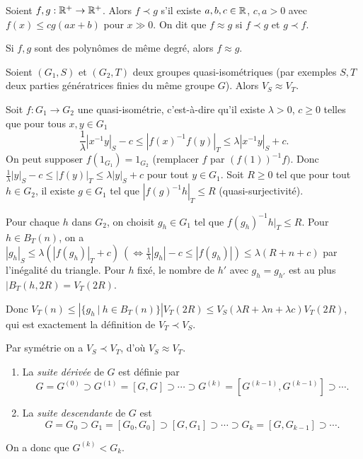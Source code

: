     \begin{defi}
      Soient $f, g: \mathbb{R}^+ \to \mathbb{R}^+$. Alors $f \prec g$ s'il existe $a, b, c \in \mathbb{R}$, $c, a > 0$ avec $f(x) \leq
      cg(ax+b)$ pour $x \gg 0$.
      On dit que $f \approx g$ si $f \prec g$ et $g \prec f$.
    \end{defi}

    \begin{exercice}
      Si $f, g$ sont des polynômes de même degré, alors $f \approx g$.
    \end{exercice}

    \begin{prop}
      Soient $(G_1, S)$ et $(G_2, T)$ deux groupes quasi-isométriques (par exemples $S, T$ deux parties
      génératrices finies du même groupe $G$). Alors $V_S \approx V_T$.
    \end{prop}

    \begin{preuve}
      Soit $f: G_1 \to G_2$ une quasi-isométrie, c'est-à-dire qu'il existe $\lambda > 0$, $c \geq 0$ telles
      que pour tous $x, y \in G_1$
        \[\frac{1}{\lambda} |x^{-1}y|_S - c \leq |f(x)^{-1}f(y)|_T \leq \lambda |x^{-1}y|_S + c.\]
      On peut supposer $f(1_{G_1}) = 1_{G_2}$ (remplacer $f$ par $(f(1))^{-1}f)$. Donc $\frac{1}{\lambda}|y|_S
      - c \leq |f(y)|_T \leq \lambda |y|_S + c$ pour tout $y \in G_1$. Soit $R \geq 0$ tel que pour tout $h \in
      G_2$, il existe $g \in G_1$ tel que $|f(g)^{-1}h|_T \leq R$ (quasi-surjectivité).
      
      Pour chaque $h$ dans $G_2$, on choisit $g_h \in G_1$ tel que $f(g_h)^{-1}h|_T \leq R$. Pour $h \in
      B_T(n)$, on a $|g_h|_S \leq \lambda (|f(g_h)|_T + c)\ ( \iff \frac{1}{\lambda}|g_h|-c \leq |f(g_h)|) \leq
      \lambda (R+n+c)$ par l'inégalité du triangle. Pour $h$ fixé, le nombre de $h'$ avec $g_h = g_{h'}$ est
      au plus $|B_T(h, 2R) = V_T(2R)$.

      Donc $V_T(n) \leq \left| \{g_h\ |\ h \in B_T(n)\} \right| V_T(2R) \leq V_S(\lambda R + \lambda n +
      \lambda c)V_T(2R)$, qui est exactement la définition de $V_T \prec V_S$.
      
      Par symétrie on a $V_S \prec V_T$, d'où $V_S \approx V_T$.
    \end{preuve}


    \begin{defi}
      \begin{enumerate}
      \item La \emph{suite dérivée}  de $G$ est définie par 
        \[G = G^{(0)} \supset G^{(1)} = [G,G] \supset \cdots \supset G^{(k)} = [G^{(k-1)}, G^{(k-1)}] \supset \cdots.\]
      \item La \emph{suite descendante}  de $G$ est 
          \[G = G_0 \supset G_1 = [G_0, G_0] \supset [G, G_1] \supset \cdots \supset G_k = [G, G_{k-1}]
          \supset \cdots.\]
      \end{enumerate}
      On a donc que $G^{(k)} < G_k$.
    \end{defi}

